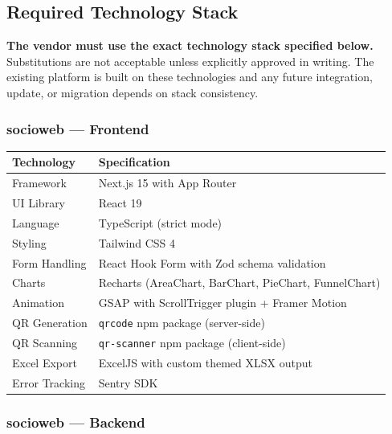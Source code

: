 \documentclass[12pt,a4paper]{article}
\begin{document}
\subsection{Required Technology Stack}

\begin{warnbox}
\textbf{The vendor must use the exact technology stack specified below.} Substitutions are not acceptable unless explicitly approved in writing. The existing platform is built on these technologies and any future integration, update, or migration depends on stack consistency.
\end{warnbox}

\vspace{0.4cm}

\subsubsection{socioweb — Frontend}

\begin{tabularx}{\textwidth}{L{4cm} X}
\toprule
{}
\textbf{Technology} & \textbf{Specification} \\
\midrule
Framework & Next.js 15 with App Router \\
UI Library & React 19 \\
Language & TypeScript (strict mode) \\
Styling & Tailwind CSS 4 \\
Form Handling & React Hook Form with Zod schema validation \\
Charts & Recharts (AreaChart, BarChart, PieChart, FunnelChart) \\
Animation & GSAP with ScrollTrigger plugin + Framer Motion \\
QR Generation & \texttt{qrcode} npm package (server-side) \\
QR Scanning & \texttt{qr-scanner} npm package (client-side) \\
Excel Export & ExcelJS with custom themed XLSX output \\
Error Tracking & Sentry SDK \\
\bottomrule
\end{tabularx}

\subsubsection{socioweb — Backend}
\end{document}

